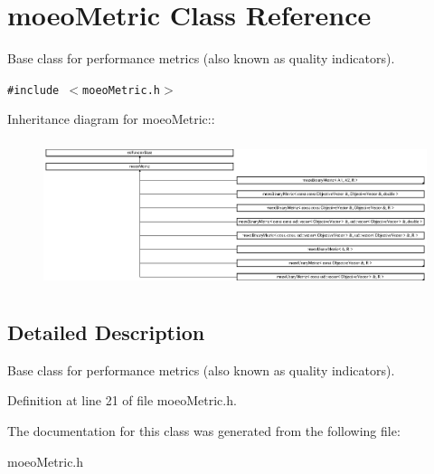 \section{moeo\-Metric Class Reference}
\label{classmoeoMetric}
Base class for performance metrics (also known as quality indicators).  


{\tt \#include $<$moeo\-Metric.h$>$}

Inheritance diagram for moeo\-Metric::\begin{figure}[H]
\begin{center}
\leavevmode
\includegraphics[height=4.31433cm]{classmoeoMetric}
\end{center}
\end{figure}


\subsection{Detailed Description}
Base class for performance metrics (also known as quality indicators). 



Definition at line 21 of file moeo\-Metric.h.

The documentation for this class was generated from the following file:\begin{CompactItemize}
\item 
moeo\-Metric.h\end{CompactItemize}
